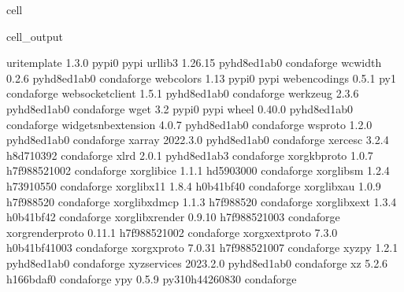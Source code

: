 \documentclass[letterpaper,table,10pt,english]{jupyterBook}
\begin{document}
\begin{sphinxuseclass}{cell}
\begin{sphinxVerbatimOutput}
\begin{sphinxuseclass}{cell_output}
\begin{sphinxVerbatim}[commandchars=\\\{\}]
uri\PYGZhy{}template              1.3.0                    pypi\PYGZus{}0    pypi
urllib3                   1.26.15            pyhd8ed1ab\PYGZus{}0    conda\PYGZhy{}forge
wcwidth                   0.2.6              pyhd8ed1ab\PYGZus{}0    conda\PYGZhy{}forge
webcolors                 1.13                     pypi\PYGZus{}0    pypi
webencodings              0.5.1                      py\PYGZus{}1    conda\PYGZhy{}forge
websocket\PYGZhy{}client          1.5.1              pyhd8ed1ab\PYGZus{}0    conda\PYGZhy{}forge
werkzeug                  2.3.6              pyhd8ed1ab\PYGZus{}0    conda\PYGZhy{}forge
wget                      3.2                      pypi\PYGZus{}0    pypi
wheel                     0.40.0             pyhd8ed1ab\PYGZus{}0    conda\PYGZhy{}forge
widgetsnbextension        4.0.7              pyhd8ed1ab\PYGZus{}0    conda\PYGZhy{}forge
wsproto                   1.2.0              pyhd8ed1ab\PYGZus{}0    conda\PYGZhy{}forge
xarray                    2022.3.0           pyhd8ed1ab\PYGZus{}0    conda\PYGZhy{}forge
xerces\PYGZhy{}c                  3.2.4                h8d71039\PYGZus{}2    conda\PYGZhy{}forge
xlrd                      2.0.1              pyhd8ed1ab\PYGZus{}3    conda\PYGZhy{}forge
xorg\PYGZhy{}kbproto              1.0.7             h7f98852\PYGZus{}1002    conda\PYGZhy{}forge
xorg\PYGZhy{}libice               1.1.1                hd590300\PYGZus{}0    conda\PYGZhy{}forge
xorg\PYGZhy{}libsm                1.2.4                h7391055\PYGZus{}0    conda\PYGZhy{}forge
xorg\PYGZhy{}libx11               1.8.4                h0b41bf4\PYGZus{}0    conda\PYGZhy{}forge
xorg\PYGZhy{}libxau               1.0.9                h7f98852\PYGZus{}0    conda\PYGZhy{}forge
xorg\PYGZhy{}libxdmcp             1.1.3                h7f98852\PYGZus{}0    conda\PYGZhy{}forge
xorg\PYGZhy{}libxext              1.3.4                h0b41bf4\PYGZus{}2    conda\PYGZhy{}forge
xorg\PYGZhy{}libxrender           0.9.10            h7f98852\PYGZus{}1003    conda\PYGZhy{}forge
xorg\PYGZhy{}renderproto          0.11.1            h7f98852\PYGZus{}1002    conda\PYGZhy{}forge
xorg\PYGZhy{}xextproto            7.3.0             h0b41bf4\PYGZus{}1003    conda\PYGZhy{}forge
xorg\PYGZhy{}xproto               7.0.31            h7f98852\PYGZus{}1007    conda\PYGZhy{}forge
xyzpy                     1.2.1              pyhd8ed1ab\PYGZus{}0    conda\PYGZhy{}forge
xyzservices               2023.2.0           pyhd8ed1ab\PYGZus{}0    conda\PYGZhy{}forge
xz                        5.2.6                h166bdaf\PYGZus{}0    conda\PYGZhy{}forge
y\PYGZhy{}py                      0.5.9           py310h4426083\PYGZus{}0    conda\PYGZhy{}forge

\end{sphinxVerbatim}
\end{sphinxuseclass}
\end{sphinxVerbatimOutput}
\end{sphinxuseclass}
\end{document}
